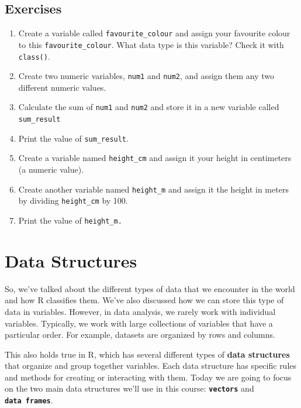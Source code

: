 \documentclass[
]{book}
\begin{document}
\hypertarget{exercises-2}{%
\subsection{Exercises}\label{exercises-2}}

\begin{enumerate}
\def\labelenumi{\arabic{enumi}.}
\item
  Create a variable called \texttt{favourite\_colour} and assign your favourite colour to this \texttt{favourite\_colour}. What data type is this variable? Check it with \texttt{class()}.
\item
  Create two numeric variables, \texttt{num1} and \texttt{num2}, and assign them any two different numeric values.
\item
  Calculate the sum of \texttt{num1} and \texttt{num2} and store it in a new variable called \texttt{sum\_result}
\item
  Print the value of \texttt{sum\_result}.
\item
  Create a variable named \texttt{height\_cm} and assign it your height in centimeters (a numeric value).
\item
  Create another variable named \texttt{height\_m} and assign it the height in meters by dividing \texttt{height\_cm} by 100.
\item
  Print the value of \texttt{height\_m.}
\end{enumerate}

\hypertarget{data-structures}{%
\section{Data Structures}\label{data-structures}}

So, we've talked about the different types of data that we encounter in the world and how R classifies them. We've also discussed how we can store this type of data in variables. However, in data analysis, we rarely work with individual variables. Typically, we work with large collections of variables that have a particular order. For example, datasets are organized by rows and columns.

This also holds true in R, which has several different types of \textbf{data structures} that organize and group together variables. Each data structure has specific rules and methods for creating or interacting with them. Today we are going to focus on the two main data structures we'll use in this course: \textbf{\texttt{vectors}} and \textbf{\texttt{data\ frames}}.
\end{document}
